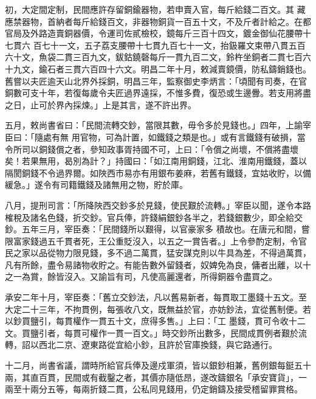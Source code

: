 \begin{pinyinscope}
初，大定間定制，民間應許存留銅鍮器物，若申賣入官，每斤給錢二百文。其
 藏應禁器物，首納者每斤給錢百文，非器物銅貨一百五十文，不及斤者計給之。在都官局及外路造賣銅器價，令運司佐貳檢校，鏡每斤三百十四文，鍍金御仙花腰帶十七貫六
 百七十一文，五子荔支腰帶十七貫九百七十一文，抬鈒羅文束帶八貫五百六十文，魚袋二貫三百九文，鈸鈷鐃磬每斤一貫九百二文，鈴杵坐銅者二貫七百六十九文，鍮石者三貫六百四十六文。明昌二年十月，敕減賣鏡價，防私鑄銷錢也。舊嘗以夫匠逾天山北界外採銅，明昌三年，監察御史李炳言：「頃聞有司奏，在官銅數可支十年，若復每歲令夫匠過界遠採，不惟多費，復恐或生邊釁。若支用將盡之日，止可於界內採煉。」上是其言，遂不許出界。



 五月，敕尚書省曰：「民間流轉交鈔，當限其數，毋令多於見錢也。」四年，上諭宰臣曰：「隨處有無
 用官物，可為計置，如鐵錢之類是也。」或有言鐵錢有破損，當令所司以銅錢償之者，參知政事胥持國不可，上曰：「令償之尚壞，不償將盡壞矣！若果無用，曷別為計？」持國曰：「如江南用銅錢，江北、淮南用鐵錢，蓋以隔閡銅錢不令過界爾。如陜西市易亦有用銀布姜麻，若舊有鐵錢，宜姑收貯，以備緩急。」遂令有司籍鐵錢及諸無用之物，貯於庫。



 八月，提刑司言：「所降陜西交鈔多於見錢，使民艱於流轉。」宰臣以聞，遂令本路榷稅及諸名色錢，折交鈔。官兵俸，許錢絹銀鈔各半之，若錢銀數少，即全給交鈔。五年三月，宰臣奏：「民間錢所以艱得，以官豪家多
 積故也。在唐元和間，嘗限富家錢過五千貫者死，王公重貶沒入，以五之一賞告者。」上令參酌定制，令官民之家以品從物力限見錢，多不過二萬貫，猛安謀克則以牛具為差，不得過萬貫，凡有所餘，盡令易諸物收貯之。有能告數外留錢者，奴婢免為良，傭者出離，以十之一為賞，餘皆沒入。又諭旨有司，凡使高麗還者，所得銅器令盡買之。



 承安二年十月，宰臣奏：「舊立交鈔法，凡以舊易新者，每貫取工墨錢十五文。至大定二十三年，不拘貫例，每張收八文，既無益於官，亦妨鈔法，宜從舊制便。若以鈔買鹽引，每貫權作一貫五十文，庶得多售。」上曰：「工
 墨錢，貫可令收十二文。買鹽引者，每貫可權作一貫一百文。」時交鈔所出數多，民間成貫例者艱於流轉，詔以西北二京、遼東路從宜給小鈔，且許於官庫換錢，與它路通行。



 十二月，尚書省議，謂時所給官兵俸及邊戍軍須，皆以銀鈔相兼，舊例銀每鋌五十兩，其直百貫，民間或有截鑿之者，其價亦隨低昂，遂改鑄銀名「承安寶貨」，一兩至十兩分五等，每兩折錢二貫，公私同見錢用，仍定銷鑄及接受稽留罪賞格。




\end{pinyinscope}

